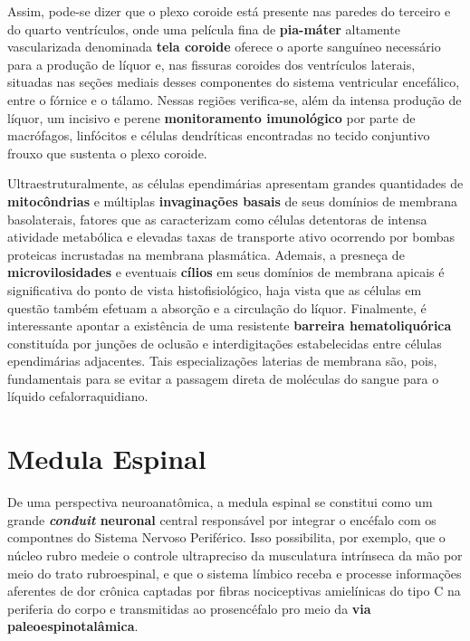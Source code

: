\documentclass[
]{book}
\begin{document}
Assim, pode-se dizer que o plexo coroide está presente nas paredes do terceiro e do quarto ventrículos, onde uma película fina de \textbf{pia-máter} altamente vascularizada denominada \textbf{tela coroide} oferece o aporte sanguíneo necessário para a produção de líquor e, nas fissuras coroides dos ventrículos laterais, situadas nas seções mediais desses componentes do sistema ventricular encefálico, entre o fórnice e o tálamo. Nessas regiões verifica-se, além da intensa produção de líquor, um incisivo e perene \textbf{monitoramento imunológico} por parte de macrófagos, linfócitos e células dendríticas encontradas no tecido conjuntivo frouxo que sustenta o plexo coroide.

Ultraestruturalmente, as células ependimárias apresentam grandes quantidades de \textbf{mitocôndrias} e múltiplas \textbf{invaginações basais} de seus domínios de membrana basolaterais, fatores que as caracterizam como células detentoras de intensa atividade metabólica e elevadas taxas de transporte ativo ocorrendo por bombas proteicas incrustadas na membrana plasmática. Ademais, a presneça de \textbf{microvilosidades} e eventuais \textbf{cílios} em seus domínios de membrana apicais é significativa do ponto de vista histofisiológico, haja vista que as células em questão também efetuam a absorção e a circulação do líquor. Finalmente, é interessante apontar a existência de uma resistente \textbf{barreira hematoliquórica} constituída por junções de oclusão e interdigitações estabelecidas entre células ependimárias adjacentes. Tais especializações laterias de membrana são, pois, fundamentais para se evitar a passagem direta de moléculas do sangue para o líquido cefalorraquidiano.

\hypertarget{medula-espinal}{%
\chapter{Medula Espinal}\label{medula-espinal}}

De uma perspectiva neuroanatômica, a medula espinal se constitui como um grande \textbf{\emph{conduit} neuronal} central responsável por integrar o encéfalo com os compontnes do Sistema Nervoso Periférico. Isso possibilita, por exemplo, que o núcleo rubro medeie o controle ultrapreciso da musculatura intrínseca da mão por meio do trato rubroespinal, e que o sistema límbico receba e processe informações aferentes de dor crônica captadas por fibras nociceptivas amielínicas do tipo C na periferia do corpo e transmitidas ao prosencéfalo pro meio da \textbf{via paleoespinotalâmica}.
\end{document}
